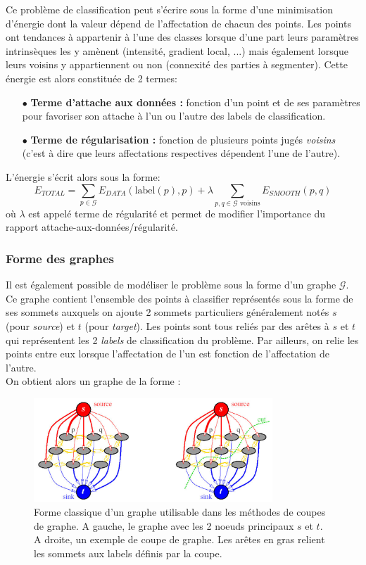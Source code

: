 \documentclass{article}
\newcommand{\G}{\mathcal{G}}
\newcommand{\lab}{\text{label}}
\begin{document}
Ce problème de classification peut s'écrire sous la forme d'une minimisation d'énergie dont la valeur dépend de l'affectation de chacun des points. Les points ont tendances à appartenir à l'une des classes lorsque d'une part leurs paramètres intrinsèques les y amènent (intensité, gradient local, ...) mais également lorsque leurs voisins y appartiennent ou non (connexité des parties à segmenter). Cette énergie est alors constituée de 2 termes:
\begin{itemize}
	\item[$\bullet$]\textbf{Terme d'attache aux données :} fonction d'un point et de ses paramètres pour favoriser son attache à l'un ou l'autre des labels de classification.
	\item[$\bullet$]\textbf{Terme de régularisation :} fonction de plusieurs points jugés \textit{voisins} (c'est à dire que leurs affectations respectives dépendent l'une de l'autre).
\end{itemize}
L'énergie s'écrit alors sous la forme:
\[
	E_{TOTAL} = \sum_{p \in \mathcal{G}} E_{DATA}(\lab(p), p) + \lambda \sum _{p,q \in \mathcal{G} \text{ voisins}} E_{SMOOTH}(p,q)
\]
où $\lambda$ est appelé terme de régularité et permet de modifier l'importance du rapport attache-aux-données/régularité.\\

\subsubsection{Forme des graphes}

Il est également possible de modéliser le problème sous la forme d'un graphe $\G$. Ce graphe contient l'ensemble des points à classifier représentés sous la forme de ses sommets auxquels on ajoute 2 sommets particuliers généralement notés $s$ (pour \textit{source}) et $t$ (pour \textit{target}). Les points sont tous reliés par des arêtes à $s$ et $t$ qui représentent les 2 \textit{labels} de classification du problème. Par ailleurs, on relie les points entre eux lorsque l'affectation de l'un est fonction de l'affectation de l'autre.\\
On obtient alors un graphe de la forme : 
\begin{figure}[!h]
	\begin{center}
		\includegraphics[width=0.8\textwidth]{Images/GC/graphcut.png} 
	\end{center}
	\caption{Forme classique d'un graphe utilisable dans les méthodes de coupes de graphe. A gauche, le graphe avec les 2 noeuds principaux $s$ et $t$. A droite, un exemple de coupe de graphe. Les arêtes en gras relient les sommets aux labels définis par la coupe.}
	\label{fig:GC_graphe}
\end{figure}
\end{document}
